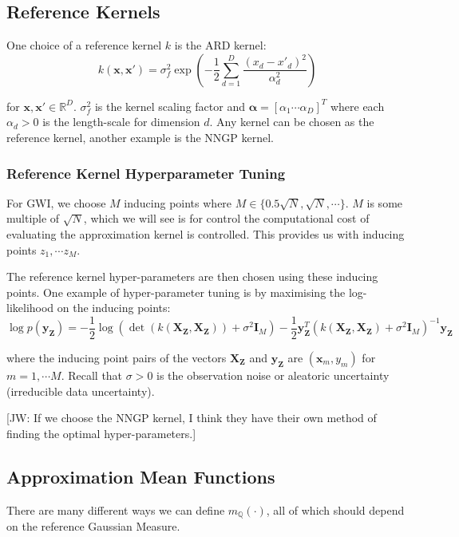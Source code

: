 \documentclass[twoside,11pt]{article}
\newcommand{\jw}[1]{{\color{gray} [JW: #1]}}
\begin{document}
\subsection{Reference Kernels}

One choice of a reference kernel $k$ is the ARD kernel:
\[k(\mathbf{x}, \mathbf{x}') = \sigma_f^2 \exp\left( - \frac{1}{2} \sum_{d=1}^D \frac{(x_d - x'_d)^2}{\alpha_d^2}\right)\]

for $\mathbf{x}, \mathbf{x}' \in \mathbb{R}^D$. $\sigma_f^2$ is the kernel scaling factor and $\mathbf{\alpha} = [\alpha_1 \cdots \alpha_D]^T$ where each $\alpha_d > 0$ is the length-scale for dimension $d$.
Any kernel can be chosen as the reference kernel, another example is the NNGP kernel.

\subsubsection{Reference Kernel Hyperparameter Tuning}
For GWI, we choose $M$ inducing points where $M \in \{0.5\sqrt{N}, \sqrt{N},\cdots\}$.
$M$ is some multiple of $\sqrt{N}$, which we will see is for control the computational cost of evaluating the approximation kernel is controlled.
This provides us with inducing points $z_1, \cdots z_M$.

The reference kernel hyper-parameters are then chosen using these inducing points.
One example of hyper-parameter tuning is by maximising the log-likelihood on the inducing points:
\[\log p(\mathbf{y}_{\mathbf{Z}}) = -\frac{1}{2}\log\left( \det (k(\mathbf{X}_{\mathbf{Z}}, \mathbf{X}_{\mathbf{Z}})) + \sigma^2 \mathbf{I}_M\right) - \frac{1}{2} \mathbf{y}_{\mathbf{Z}}^T\left(k(\mathbf{X}_{\mathbf{Z}}, \mathbf{X}_{\mathbf{Z}}) + \sigma^2 \mathbf{I}_M\right)^{-1} \mathbf{y}_{\mathbf{Z}}\]

where the inducing point pairs of the vectors $\mathbf{X}_{\mathbf{Z}}$ and $\mathbf{y}_{\mathbf{Z}}$ are $(\mathbf{x}_m, y_m)$ for $m=1,\cdots M$.
Recall that $\sigma >0$ is the observation noise or aleatoric uncertainty (irreducible data uncertainty).

\jw{If we choose the NNGP kernel, I think they have their own method of finding the optimal hyper-parameters.}

\subsection{Approximation Mean Functions}\label{subsec:approximation-mean-functions}
There are many different ways we can define $m_{\mathbb{Q}}(\cdot)$, all of which should depend on the reference Gaussian Measure.
\end{document}
